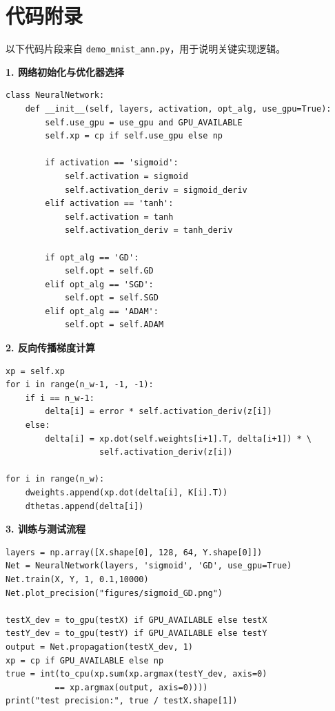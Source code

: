 \documentclass[a4paper,10pt,twocolumn]{article}
\begin{document}
\section{代码附录}

以下代码片段来自 \texttt{demo\_mnist\_ann.py}，用于说明关键实现逻辑。

\textbf{1. 网络初始化与优化器选择}
\begin{lstlisting}
class NeuralNetwork:
    def __init__(self, layers, activation, opt_alg, use_gpu=True):
        self.use_gpu = use_gpu and GPU_AVAILABLE
        self.xp = cp if self.use_gpu else np

        if activation == 'sigmoid':
            self.activation = sigmoid
            self.activation_deriv = sigmoid_deriv
        elif activation == 'tanh':
            self.activation = tanh
            self.activation_deriv = tanh_deriv

        if opt_alg == 'GD':
            self.opt = self.GD
        elif opt_alg == 'SGD':
            self.opt = self.SGD
        elif opt_alg == 'ADAM':
            self.opt = self.ADAM
\end{lstlisting}

\textbf{2. 反向传播梯度计算}
\begin{lstlisting}
xp = self.xp
for i in range(n_w-1, -1, -1):
    if i == n_w-1:
        delta[i] = error * self.activation_deriv(z[i])
    else:
        delta[i] = xp.dot(self.weights[i+1].T, delta[i+1]) * \
                   self.activation_deriv(z[i])

for i in range(n_w):
    dweights.append(xp.dot(delta[i], K[i].T))
    dthetas.append(delta[i])
\end{lstlisting}

\textbf{3. 训练与测试流程}
\begin{lstlisting}
layers = np.array([X.shape[0], 128, 64, Y.shape[0]])
Net = NeuralNetwork(layers, 'sigmoid', 'GD', use_gpu=True)
Net.train(X, Y, 1, 0.1,10000)
Net.plot_precision("figures/sigmoid_GD.png")

testX_dev = to_gpu(testX) if GPU_AVAILABLE else testX
testY_dev = to_gpu(testY) if GPU_AVAILABLE else testY
output = Net.propagation(testX_dev, 1)
xp = cp if GPU_AVAILABLE else np
true = int(to_cpu(xp.sum(xp.argmax(testY_dev, axis=0)
          == xp.argmax(output, axis=0))))
print("test precision:", true / testX.shape[1])
\end{lstlisting}
\end{document}
